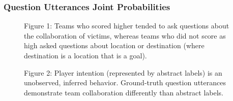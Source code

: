 \subsubsection{Question Utterances Joint Probabilities}
\begin{figure}[h!]
    \centering
    \caption{Figure 1: Teams who scored higher tended to ask questions about the collaboration of victims, whereas teams who did not score as high asked questions about location or destination (where destination is a location that is a goal).}
\end{figure}








\newpage

\begin{figure}[h!]
    \centering
    \caption{Figure 2: Player intention (represented by abstract labels) is an unobserved, inferred behavior. Ground-truth question utterances demonstrate team collaboration differently than abstract labels.}
\end{figure}








